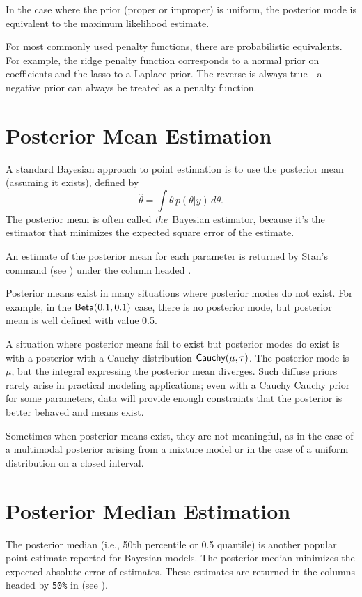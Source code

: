 In the case where the prior (proper or improper) is uniform, the
posterior mode is equivalent to the maximum likelihood estimate.

For most commonly used penalty functions, there are probabilistic
equivalents.  For example, the ridge penalty function corresponds to a
normal prior on coefficients and the lasso to a Laplace prior.  The
reverse is always true---a negative prior can always be treated as a
penalty function.



\section{Posterior Mean Estimation}

A standard Bayesian approach to point estimation is to use the
posterior mean (assuming it exists), defined by
%
\[
\hat{\theta} = \int \theta \, p(\theta|y) \, d\theta.
\]
%
The posterior mean is often called {\it the}\ Bayesian estimator,
because it's the estimator that minimizes the expected square error of
the estimate.

An estimate of the posterior mean for each parameter is returned by Stan's
 command (see ) under the
column headed .

Posterior means exist in many situations where posterior
modes do not exist.  For example, in the $\distro{Beta}(0.1, 0.1)$
case, there is no posterior mode, but posterior mean is well defined
with value 0.5.  

A situation where posterior means fail to exist but posterior modes do
exist is with a posterior with a Cauchy distribution
$\distro{Cauchy}(\mu,\tau)$.  The posterior mode is $\mu$, but the
integral expressing the posterior mean diverges.  Such diffuse priors
rarely arise in practical modeling applications; even with a Cauchy
Cauchy prior for some parameters, data will provide enough constraints
that the posterior is better behaved and means exist.

Sometimes when posterior means exist, they are not meaningful, as in
the case of a multimodal posterior arising from a mixture model or in
the case of a uniform distribution on a closed interval.  


\section{Posterior Median Estimation}

The posterior median (i.e., 50th percentile or 0.5 quantile) is
another popular point estimate reported for Bayesian models.  The
posterior median minimizes the expected absolute error of estimates.
These estimates are returned in the columns headed by \Verb|50%
in  (see ).

